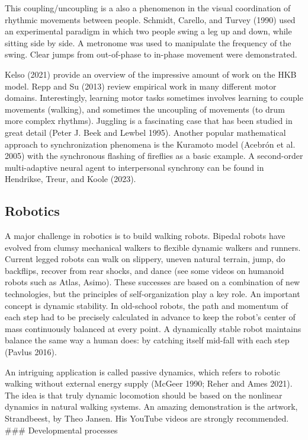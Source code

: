 \documentclass[
  letterpaper,
]{scrbook}
\begin{document}
This coupling/uncoupling is a also a phenomenon in the visual
coordination of rhythmic movements between people. Schmidt, Carello, and
Turvey (1990) used an experimental paradigm in which two people swing a
leg up and down, while sitting side by side. A metronome was used to
manipulate the frequency of the swing. Clear jumps from out-of-phase to
in-phase movement were demonstrated.

Kelso (2021) provide an overview of the impressive amount of work on the
HKB model. Repp and Su (2013) review empirical work in many different
motor domains. Interestingly, learning motor tasks sometimes involves
learning to couple movements (walking), and sometimes the uncoupling of
movements (to drum more complex rhythms). Juggling is a fascinating case
that has been studied in great detail (Peter J. Beek and Lewbel 1995).
Another popular mathematical approach to synchronization phenomena is
the Kuramoto model (Acebrón et al. 2005) with the synchronous flashing
of fireflies as a basic example. A second-order multi-adaptive neural
agent to interpersonal synchrony can be found in Hendrikse, Treur, and
Koole (2023).

\hypertarget{robotics}{%
\subsection{Robotics}\label{robotics}}

A major challenge in robotics is to build walking robots. Bipedal robots
have evolved from clumsy mechanical walkers to flexible dynamic walkers
and runners. Current legged robots can walk on slippery, uneven natural
terrain, jump, do backflips, recover from rear shocks, and dance (see
some videos on humanoid robots such as Atlas, Asimo). These successes
are based on a combination of new technologies, but the principles of
self-organization play a key role. An important concept is dynamic
stability. In old-school robots, the path and momentum of each step had
to be precisely calculated in advance to keep the robot's center of mass
continuously balanced at every point. A dynamically stable robot
maintains balance the same way a human does: by catching itself mid-fall
with each step (Pavlus 2016).

An intriguing application is called passive dynamics, which refers to
robotic walking without external energy supply (McGeer 1990; Reher and
Ames 2021). The idea is that truly dynamic locomotion should be based on
the nonlinear dynamics in natural walking systems. An amazing
demonstration is the artwork, Strandbeest, by Theo Jansen. His YouTube
videos are strongly recommended. \#\#\# Developmental processes
\end{document}
